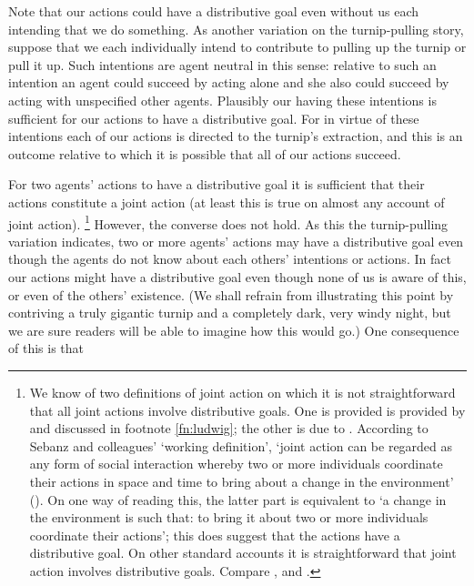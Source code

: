 \documentclass[14pt,a4paper]{extarticle}
\begin{document}
Note that our actions could have a distributive goal even without us each intending that we do something.
As another variation on the turnip-pulling story,
suppose that we each individually intend to 
	contribute to pulling up the turnip or pull it up.
Such intentions are agent neutral in this sense:
relative to such an intention an agent 
	could succeed by acting alone 
and
  she also could succeed by acting with unspecified other agents.
Plausibly our having these intentions is sufficient for our actions to have a distributive goal.
For in virtue of these intentions each of our actions is directed to the turnip's extraction,
and this is an outcome relative to which it is possible that all of our actions succeed.

For two agents' actions to have a distributive goal it is sufficient that their actions constitute a joint action 
(at least this is true on almost any account of joint action).%
\footnote{
We know of two definitions of joint action on which it is not straightforward that all joint actions involve distributive goals.
One is provided 
 is provided by \citet[p.\ 366]{ludwig_collective_2007} and discussed in footnote \vref{fn:ludwig}; the other is due to 
\citet[p.\ 70]{Sebanz:2006yq}.
According to Sebanz and colleagues' `working definition', 
`joint action can be regarded as any form of social interaction whereby two or more individuals coordinate their actions in space and time to bring about a change in the environment'
(\citeyear[p.\ 70]{Sebanz:2006yq}).
On one way of reading this, the latter part is equivalent to `a change in the environment is such that: to bring it about two or more individuals coordinate their actions';
 this does suggest that the actions have a distributive goal.
On other standard accounts it is straightforward that joint action involves distributive goals.
Compare 
	\citet[pp.\ 329-31]{Bratman:1992mi},
	\citet[pp.\ 96-7]{Searle:1990em} and
	\citet[pp.\ 168-9]{gilbert:2009shared}.
}
However, the converse does not hold.
As this the turnip-pulling variation  indicates,
two or more agents' actions may have a distributive goal 
even though the agents do not know about each others' intentions or actions.
In fact our actions might have a distributive goal even though none of us is aware of this, or even of the others' existence. 
(We shall refrain from illustrating this point by contriving a truly gigantic turnip and a completely dark, very windy night, but we are sure readers will be able to imagine how this would go.)
One consequence of this is that 
\end{document}
